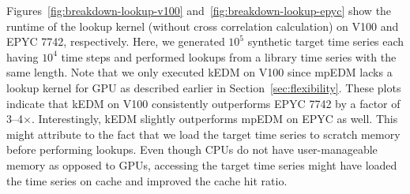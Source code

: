 \documentclass{acmart}
\begin{document}
Figures~\ref{fig:breakdown-lookup-v100} and~\ref{fig:breakdown-lookup-epyc}
show the runtime of the lookup kernel (without cross correlation calculation) on V100 and EPYC 7742, respectively.
Here, we generated $10^5$ synthetic target time series each having $10^4$ time 
steps and performed lookups from a library time series with the same length.
Note that we only executed kEDM on
V100 since mpEDM lacks a lookup kernel for GPU as described earlier in
Section~\ref{sec:flexibility}. These plots indicate that kEDM on V100
consistently outperforms EPYC 7742 by a factor of 3--4$\times$.
Interestingly, kEDM slightly outperforms mpEDM on EPYC as well. 
This might attribute to the fact that we load the target time series to scratch memory before performing lookups. Even though CPUs do not have user-manageable memory as opposed to GPUs, accessing the
target time series might have loaded the time series on cache and improved the
cache hit ratio.
\end{document}
